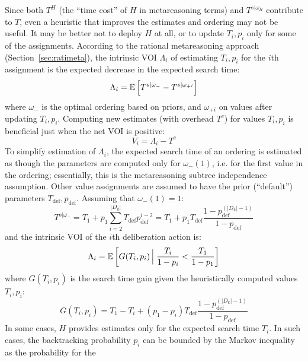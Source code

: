 Since both $T^H$ (the ``time cost'' of $H$ in metareasoning terms)
and $T^{s|\omega_H}$ contribute to $T$, even a heuristic that
improves the estimates and ordering may not be useful.  It may be better not
to deploy $H$ at all, or to update $T_i, p_i$ only for some of the assignments.
According to the rational metareasoning approach (Section~\ref{sec:ratimeta}),
the intrinsic VOI $\Lambda_i$ of estimating $T_i, p_i$ for the $i$th assignment
is the expected decrease in the expected search time:
\begin{equation}
\label{eq:value-ordering-benefit}
\Lambda_i=\mathbb{E}\left[T^{s|\omega_-}-T^{s|\omega_{+i}}\right]
\end{equation}
where $\omega_-$ is the optimal ordering based on priors,
and $\omega_{+i}$ on values after updating $T_i, p_i$.
Computing new estimates (with overhead $T^c$) for values $T_i, p_i$
is beneficial just when the net VOI is positive:
\begin{equation}
\label{eq:voi}
V_i=\Lambda_i-T^c
\end{equation}
To simplify estimation of $\Lambda_i$, the expected
search time of an ordering is estimated as though the parameters are
computed only for $\omega_-(1)$, i.e. for the first value in the ordering;
essentially, this is the metareasoning subtree independence assumption.
 Other value assignments are assumed to have the prior (``default'')
parameters $T_\mathrm{def}, p_\mathrm{def}$. Assuming  that $\omega_-(1)=1$:
\begin{equation}
\label{eq:time-estimate}
T^{s|\omega_-}=T_1+p_1\sum_{i=2}^{|D_k|}T_\mathrm{def}p_\mathrm{def}^{i-2}
   =T_1+p_1T_\mathrm{def}\frac{1-p_\mathrm{def}^{(|D_k|-1)}} {1-p_\mathrm{def}}
\end{equation}
and the intrinsic VOI of the $i$th deliberation action is:
\begin{equation}
\label{eq:benefit-estimate}
\Lambda_i=\mathbb{E}\left[G(T_i, p_i)\,\Big|\;\frac {T_i} {1-p_i} < \frac {T_1} {1-p_1}\right]
\end{equation}
where $G(T_i, p_i)$ is the search time gain given the heuristically computed values $T_i, p_i$:
\begin{equation}
\label{eq:gain}
G(T_i, p_i) = T_1-T_i+(p_1-p_i)T_\mathrm{def}\frac{1-p_\mathrm{def}^{(|D_k|-1)}}{1-p_\mathrm{def}}
\end{equation}
In some cases, $H$ provides estimates only for the expected
search time $T_i$. In such cases, the backtracking probability $p_i$
can be bounded by the Markov inequality as the probability for the
